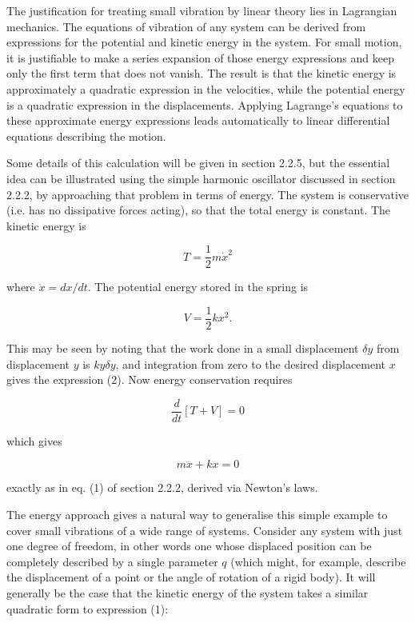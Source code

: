   The justification for treating small vibration by linear theory lies in 
  Lagrangian mechanics. The equations of vibration of any system can be derived 
  from expressions for the potential and kinetic energy in the system. For 
  small motion, it is justifiable to make a series expansion of those energy 
  expressions and keep only the first term that does not vanish. The result is 
  that the kinetic energy is approximately a quadratic expression in the 
  velocities, while the potential energy is a quadratic expression in the 
  displacements. Applying Lagrange's equations to these approximate energy 
  expressions leads automatically to linear differential equations describing 
  the motion. 

  Some details of this calculation will be given in section 2.2.5, but the 
  essential idea can be illustrated using the simple harmonic oscillator 
  discussed in section 2.2.2, by approaching that problem in terms of energy. 
  The system is conservative (i.e. has no dissipative forces acting), so that 
  the total energy is constant. The kinetic energy is 

  $$T=\frac{1}{2} m \dot{x}^2 \tag{1}$$ 

  where $\dot{x}=dx/dt$. The potential energy stored in the spring is 

  $$V=\frac{1}{2} k x^2. \tag{2}$$ 

  This may be seen by noting that the work done in a small displacement $\delta 
  y$ from displacement $y$ is $ky\delta y$, and integration from zero to the 
  desired displacement $x$ gives the expression (2). Now energy conservation 
  requires 

  $$\dfrac{d}{dt} [T+V]=0 \tag{3} $$ 

  which gives 

  $$m \ddot{x} +kx=0 \tag{4}$$ 

  exactly as in eq. (1) of section 2.2.2, derived via Newton's laws. 

  The energy approach gives a natural way to generalise this simple example to 
  cover small vibrations of a wide range of systems. Consider any system with 
  just one degree of freedom, in other words one whose displaced position can 
  be completely described by a single parameter $q$ (which might, for example, 
  describe the displacement of a point or the angle of rotation of a rigid 
  body). It will generally be the case that the kinetic energy of the system 
  takes a similar quadratic form to expression (1): 

